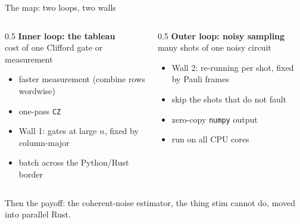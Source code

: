 \documentclass[aspectratio=169]{beamer}
\newcommand{\code}[1]{\texttt{#1}}
\begin{document}
\begin{frame}{The map: two loops, two walls}
  \begin{columns}[T]
    \begin{column}{0.5\textwidth}
      \centering\textbf{Inner loop: the tableau}\\
      {\scriptsize cost of one Clifford gate or measurement}
      \vspace{2mm}
      \begin{itemize}
        \item faster measurement (combine rows wordwise)
        \item one-pass \code{CZ}
        \item \alert{Wall 1}: gates at large $n$, fixed by column-major
        \item batch across the Python/Rust border
      \end{itemize}
    \end{column}
    \begin{column}{0.5\textwidth}
      \centering\textbf{Outer loop: noisy sampling}\\
      {\scriptsize many shots of one noisy circuit}
      \vspace{2mm}
      \begin{itemize}
        \item \alert{Wall 2}: re-running per shot, fixed by Pauli frames
        \item skip the shots that do not fault
        \item zero-copy \code{numpy} output
        \item run on all CPU cores
      \end{itemize}
    \end{column}
  \end{columns}
  \vfill
  \begin{center}\small Then the payoff: the coherent-noise estimator, the thing stim cannot do, moved into parallel Rust.\end{center}
\end{frame}
\end{document}
